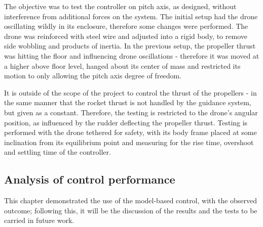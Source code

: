 The objective was to test the controller on pitch axis, as designed, without interference from additional forces on the system. The initial setup had the drone oscillating wildly in its enclosure, therefore some changes were performed. 
The drone was reinforced with steel wire and adjusted into a rigid body, to remove side wobbling and products of inertia. 
In the previous setup, the propeller thrust was hitting the floor and influencing drone oscillations - therefore it was moved at a higher above floor level, hanged about its  center of mass and  restricted its motion to only allowing the pitch axis degree of freedom. 

It is outside of the scope of the project to control the thrust of the propellers - in the same manner that the rocket thrust is not handled by the guidance system, but given as a constant. 
Therefore, the testing is restricted to the drone's angular position, as influenced by the rudder deflecting the propeller thrust. Testing is performed with the drone tethered for safety, with its body frame placed at some inclination from its equilibrium point and measuring for the rise time, overshoot and settling time of the controller. 


\subsection{Analysis of control performance}




This chapter demonstrated the use of the model-based control, with the observed outcome; following this, it will be the discussion of the results and the tests to be carried in future work. 
